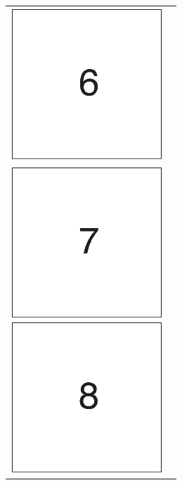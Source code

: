 \documentclass[11pt, oneside]{article}
\begin{document}
\begin{figure}[htbp]
\begin{tabular}{cc}
\begin{minipage}{0.333\hsize}
\begin{center}
\includegraphics[width=57mm]{../data/fig6.eps}
\end{center}
\end{minipage}
\\\vspace{\vmargin}
\begin{minipage}{0.333\hsize}
\begin{center}
\includegraphics[width=57mm]{../data/fig7.eps}
\end{center}
\end{minipage}

\begin{minipage}{0.333\hsize}
\begin{center}
\includegraphics[width=57mm]{../data/fig8.eps}
\end{center}
\end{minipage}


\end{tabular}
\end{figure}
\end{document}
